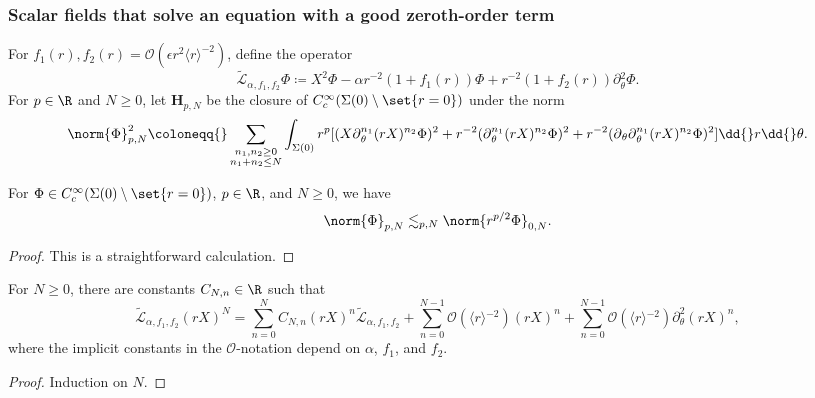 \documentclass[10pt, reqno]{amsart}
\begin{document}
\subsubsection{Scalar fields that solve an equation with a good zeroth-order term}
\label{good-scalar-field-tinv}
For \(f_1(r),f_2(r)=\mathcal{O}(\epsilon{}r^2\langle{}r\rangle^{-2})\), define the operator
\begin{equation}
\tilde{\mathcal{L}}_{\alpha{},f_1,f_2}\Phi{}\coloneqq{} X^2\Phi{} - \alpha{}r^{-2}(1+f_1(r))\Phi{} + r^{-2}(1+f_2(r))\partial{}_\theta^2\Phi{}.
\end{equation}
For \(p\in \R\) and \(N\ge 0\), let \(\mathbf{H}_{p,N}\) be the closure of
\(C_c^\infty(\Sigma{}(0)\setminus \set{r=0})\) under the norm
\begin{equation}
\norm{\Phi{}}_{p,N}^2\coloneqq{}\sum_{\substack{n_1,n_2\ge 0\\n_1+n_2\le N}}\int _{\Sigma{}(0)} r^p[(X\partial{}_\theta^{n_1}(rX)^{n_2}\Phi{})^2 + r^{-2}(\partial{}_\theta^{n_1}(rX)^{n_2}\Phi{})^2 + r^{-2}(\partial{}_\theta{}\partial{}_\theta^{n_1}(rX)^{n_2}\Phi{})^2]\dd{}r\dd{}\theta{}.
\end{equation}
\begin{lemma}
For \(\Phi{}\in C_c^\infty(\Sigma{}(0)\setminus \set{r=0})\), \(p\in \R\), and \(N\ge 0\), we have
\begin{equation}
\norm{\Phi{}}_{p,N}\lesssim_{p,N} \norm{r^{p/2}\Phi{}}_{0,N}.
\end{equation}
\label{norm-comparison}
\end{lemma}
\begin{proof}
This is a straightforward calculation.
\end{proof}
\begin{lemma}
For \(N\ge 0\), there are constants \(C_{N,n}\in \R\) such that
\begin{equation}
\tilde{\mathcal{L}}_{\alpha{},f_1,f_2}(rX)^N = \sum_{n=0}^NC_{N,n}(rX)^n\tilde{\mathcal{L}}_{\alpha{},f_1,f_2} + \sum_{n=0}^{N-1}\mathcal{O}(\langle{}r\rangle{}^{-2})(rX)^n + \sum_{n=0}^{N-1}\mathcal{O}(\langle{}r\rangle{}^{-2})\partial_\theta^2(rX)^n,
\end{equation}
where the implicit constants in the \(\mathcal{O}\)-notation depend on \(\alpha{}\),
\(f_1\), and \(f_2\).
\label{L-rX-commutation}
\end{lemma}
\begin{proof}
Induction on \(N\).
\end{proof}
\end{document}
